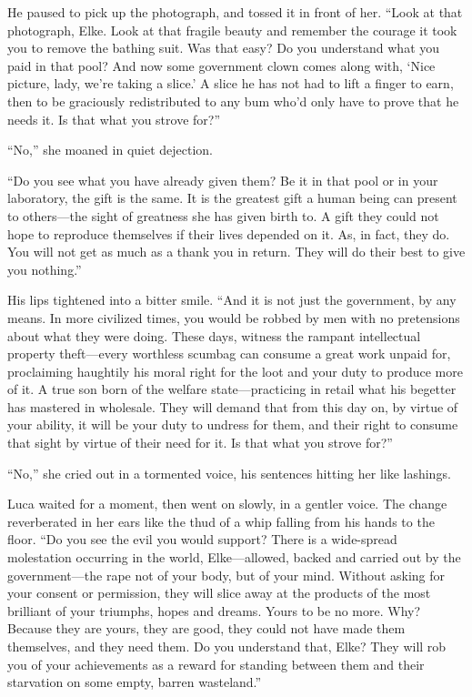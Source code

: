He paused to pick up the photograph, and tossed it in front of her. ``Look at that photograph, Elke. Look at that fragile beauty and remember the courage it took you to remove the bathing suit. Was that easy? Do you understand what you paid in that pool? And now some government clown comes along with, `Nice picture, lady, we're taking a slice.' A slice he has not had to lift a finger to earn, then to be graciously redistributed to any bum who'd only have to prove that he needs it. Is that what you strove for?''

``No,'' she moaned in quiet dejection.

``Do you see what you have already given them? Be it in that pool or in your laboratory, the gift is the same. It is the greatest gift a human being can present to others---the sight of greatness she has given birth to. A gift they could not hope to reproduce themselves if their lives depended on it. As, in fact, they do. You will not get as much as a thank you in return. They will do their best to give you nothing.''

His lips tightened into a bitter smile. ``And it is not just the government, by any means. In more civilized times, you would be robbed by men with no pretensions about what they were doing. These days, witness the rampant intellectual property theft---every worthless scumbag can consume a great work unpaid for, proclaiming haughtily his moral right for the loot and your duty to produce more of it. A true son born of the welfare state---practicing in retail what his begetter has mastered in wholesale. They will demand that from this day on, by virtue of your ability, it will be your duty to undress for them, and their right to consume that sight by virtue of their need for it. Is that what you strove for?''

``No,'' she cried out in a tormented voice, his sentences hitting her like lashings.

Luca waited for a moment, then went on slowly, in a gentler voice. The change reverberated in her ears like the thud of a whip falling from his hands to the floor. ``Do you see the evil you would support? There is a wide-spread molestation occurring in the world, Elke---allowed, backed and carried out by the government---the rape not of your body, but of your mind. Without asking for your consent or permission, they will slice away at the products of the most brilliant of your triumphs, hopes and dreams. Yours to be no more. Why? Because they are yours, they are good, they could not have made them themselves, and they need them. Do you understand that, Elke? They will rob you of your achievements as a reward for standing between them and their starvation on some empty, barren wasteland.''


